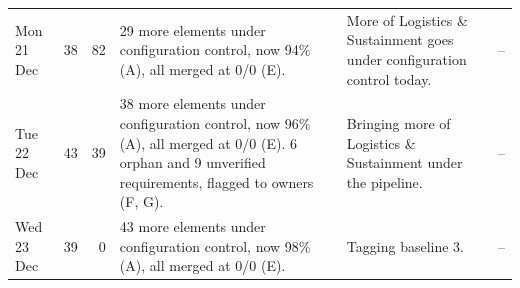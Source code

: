 \documentclass[12pt,letterpaper,oneside]{article}
\begin{document}
{\begin{longtable}{@{}>{\raggedright}p{} r r >{\raggedright}p{} >{\raggedright}p{} >{\raggedright\arraybackslash}p{}@{}}
Mon 21 Dec & 38 & 82 & 29 more elements under configuration control, now 94\% (A), all merged at 0/0 (E). & More of Logistics \& Sustainment goes under configuration control today. & -- \\
Tue 22 Dec & 43 & 39 & 38 more elements under configuration control, now 96\% (A), all merged at 0/0 (E). 6 orphan and 9 unverified requirements, flagged to owners (F, G). & Bringing more of Logistics \& Sustainment under the pipeline. & -- \\
Wed 23 Dec & 39 & 0 & 43 more elements under configuration control, now 98\% (A), all merged at 0/0 (E). & Tagging baseline 3. & -- \\
\end{longtable}}
\end{document}
